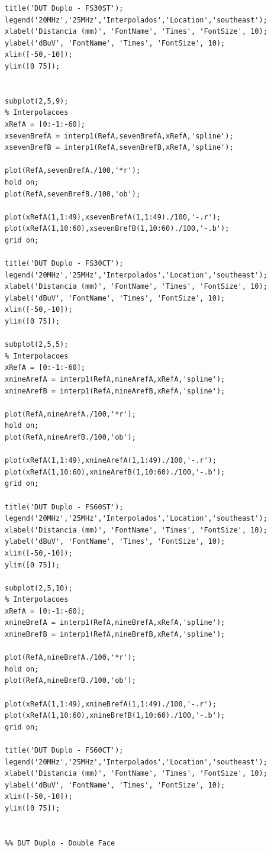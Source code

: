 \begin{lstlisting}
title('DUT Duplo - FS30ST');
legend('20MHz','25MHz','Interpolados','Location','southeast');
xlabel('Distancia (mm)', 'FontName', 'Times', 'FontSize', 10);
ylabel('dBuV', 'FontName', 'Times', 'FontSize', 10);
xlim([-50,-10]);
ylim([0 75]);


subplot(2,5,9);
% Interpolacoes
xRefA = [0:-1:-60];
xsevenBrefA = interp1(RefA,sevenBrefA,xRefA,'spline');
xsevenBrefB = interp1(RefA,sevenBrefB,xRefA,'spline');

plot(RefA,sevenBrefA./100,'*r');
hold on;
plot(RefA,sevenBrefB./100,'ob');

plot(xRefA(1,1:49),xsevenBrefA(1,1:49)./100,'-.r');
plot(xRefA(1,10:60),xsevenBrefB(1,10:60)./100,'-.b');
grid on;

title('DUT Duplo - FS30CT');
legend('20MHz','25MHz','Interpolados','Location','southeast');
xlabel('Distancia (mm)', 'FontName', 'Times', 'FontSize', 10);
ylabel('dBuV', 'FontName', 'Times', 'FontSize', 10);
xlim([-50,-10]);
ylim([0 75]);

subplot(2,5,5);
% Interpolacoes
xRefA = [0:-1:-60];
xnineArefA = interp1(RefA,nineArefA,xRefA,'spline');
xnineArefB = interp1(RefA,nineArefB,xRefA,'spline');

plot(RefA,nineArefA./100,'*r');
hold on;
plot(RefA,nineArefB./100,'ob');

plot(xRefA(1,1:49),xnineArefA(1,1:49)./100,'-.r');
plot(xRefA(1,10:60),xnineArefB(1,10:60)./100,'-.b');
grid on;

title('DUT Duplo - FS60ST');
legend('20MHz','25MHz','Interpolados','Location','southeast');
xlabel('Distancia (mm)', 'FontName', 'Times', 'FontSize', 10);
ylabel('dBuV', 'FontName', 'Times', 'FontSize', 10);
xlim([-50,-10]);
ylim([0 75]);

subplot(2,5,10);
% Interpolacoes
xRefA = [0:-1:-60];
xnineBrefA = interp1(RefA,nineBrefA,xRefA,'spline');
xnineBrefB = interp1(RefA,nineBrefB,xRefA,'spline');

plot(RefA,nineBrefA./100,'*r');
hold on;
plot(RefA,nineBrefB./100,'ob');

plot(xRefA(1,1:49),xnineBrefA(1,1:49)./100,'-.r');
plot(xRefA(1,10:60),xnineBrefB(1,10:60)./100,'-.b');
grid on;

title('DUT Duplo - FS60CT');
legend('20MHz','25MHz','Interpolados','Location','southeast');
xlabel('Distancia (mm)', 'FontName', 'Times', 'FontSize', 10);
ylabel('dBuV', 'FontName', 'Times', 'FontSize', 10);
xlim([-50,-10]);
ylim([0 75]);


%% DUT Duplo - Double Face


\end{lstlisting}
